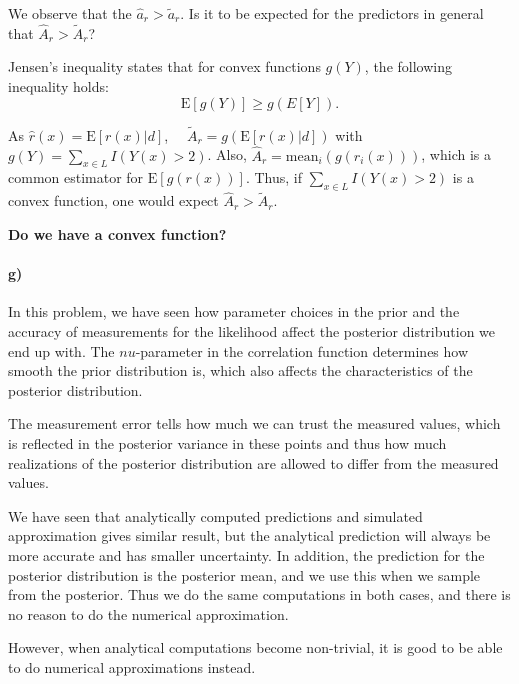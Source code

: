 We observe that the $\hat{a}_r > \tilde{a}_r$. 
Is it to be expected for the predictors in general that $\hat{A}_r > \tilde{A}_r$? 

Jensen's inequality states that for convex functions $g(Y)$, the following inequality holds: 
\begin{equation*}
    \text{E}[g(Y)] \geq g(E[Y]).
\end{equation*}

As $\hat{r}(x) = \text{E}[r(x)|d]$, $\quad \tilde{A}_r = g(\text{E}[r(x)|d])$ with $g(Y) = \sum_{x \in L} I(Y(x)>2)$. Also, $\hat{A}_r = \text{mean}_i(g(r_i(x)))$, which is a common estimator for $\text{E}[g(r(x))]$.
Thus, if $\sum_{x \in L} I(Y(x)>2)$ is a convex function, one would expect $\hat{A}_r > \tilde{A}_r$.

\textbf{Do we have a convex function?}
\paragraph{g)}
In this problem, we have seen how parameter choices in the prior and the accuracy of measurements for the likelihood affect the posterior distribution we end up with. The $nu$-parameter in the correlation function determines how smooth the prior distribution is, which also affects the characteristics of the posterior distribution. 

The measurement error tells how much we can trust the measured values, which is reflected in the posterior variance in these points and thus how much realizations of the posterior distribution are allowed to differ from the measured values.

We have seen that analytically computed predictions and simulated approximation gives similar result, but the analytical prediction will always be more accurate and has smaller uncertainty. In addition, the prediction for the posterior distribution is the posterior mean, and we use this when we sample from the posterior. Thus we do the same computations in both cases, and there is no reason to do the numerical approximation. 

However, when analytical computations become non-trivial, it is good to be able to do numerical approximations instead.


